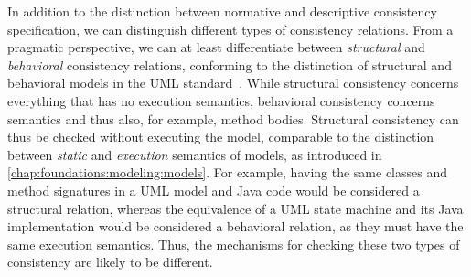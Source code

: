 In addition to the distinction between normative and descriptive consistency specification, we can distinguish different types of consistency relations.
From a pragmatic perspective, we can at least differentiate between \emph{structural} and \emph{behavioral} consistency relations, conforming to the distinction of structural and behavioral models in the \gls{UML} standard~\cite{uml}.
While structural consistency concerns everything that has no execution semantics, behavioral consistency concerns semantics and thus also, for example, method bodies.
Structural consistency can thus be checked without executing the model, comparable to the distinction between \emph{static} and \emph{execution} semantics of models, as introduced in \autoref{chap:foundations:modeling:models}.
For example, having the same classes and method signatures in a \gls{UML} model and Java code would be considered a structural relation, whereas the equivalence of a \gls{UML} state machine and its Java implementation would be considered a behavioral relation, as they must have the same execution semantics.
Thus, the mechanisms for checking these two types of consistency are likely to be different.

